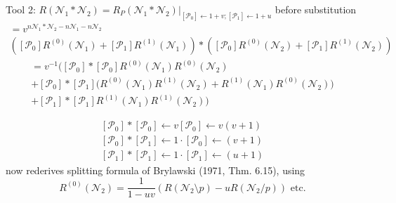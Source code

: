 \documentclass[%
  slidesonly,%
  semlayer,%
  amsmath
  ]{seminar}                                  %
\begin{document}
\begin{slide}
Tool 2: $R(\mathcal{N}_1*\mathcal{N}_2)=
R_P(\mathcal{N}_1*\mathcal{N}_2)|_{\left[\mathcal{P}_0\right]\leftarrow 1+v;
				   \left[\mathcal{P}_1\right]\leftarrow 1+u}$
before substitution\begin{multline*}
=v^{n\mathcal{N}_1*\mathcal{N}_2-n\mathcal{N}_1-n\mathcal{N}_2}\\
\left(
   \left[\mathcal{P}_0\right]R^{(0)}(\mathcal{N}_1)
  +\left[\mathcal{P}_1\right]R^{(1)}(\mathcal{N}_1)
\right)
*
\left(
   \left[\mathcal{P}_0\right]R^{(0)}(\mathcal{N}_2)
  +\left[\mathcal{P}_1\right]R^{(1)}(\mathcal{N}_2)
\right)
\end{multline*}
\begin{multline*}
=v^{-1}\Big(
    \left[\mathcal{P}_0\right]*\left[\mathcal{P}_0\right]R^{(0)}(\mathcal{N}_1)R^{(0)}(\mathcal{N}_2)\\
+\left[\mathcal{P}_0\right]*\left[\mathcal{P}_1\right]
\big(R^{(0)}(\mathcal{N}_1)R^{(1)}(\mathcal{N}_2)+
      R^{(1)}(\mathcal{N}_1)R^{(0)}(\mathcal{N}_2)\big)\\
+\left[\mathcal{P}_1\right]*\left[\mathcal{P}_1\right]
      R^{(1)}(\mathcal{N}_1)R^{(1)}(\mathcal{N}_2)\Big)
\end{multline*}

\begin{multline*}
\left[\mathcal{P}_0\right]*\left[\mathcal{P}_0\right]\leftarrow v\left[\mathcal{P}_0\right]
\leftarrow v(v+1)\\
\left[\mathcal{P}_0\right]*\left[\mathcal{P}_1\right]\leftarrow 1\cdot\left[\mathcal{P}_0\right]
\leftarrow (v+1)\\
\left[\mathcal{P}_1\right]*\left[\mathcal{P}_1\right]\leftarrow 1\cdot\left[\mathcal{P}_1\right]
\leftarrow (u+1)
\end{multline*}
now rederives splitting formula of Brylawski (1971, Thm. 6.15), using
\[
R^{(0)}(\mathcal{N}_2)=\frac{1}{1-uv}\left(R(\mathcal{N}_2\setminus p) - uR(\mathcal{N}_2/p)\right)
\text{  etc.}
\]
\end{slide}
\end{document}
